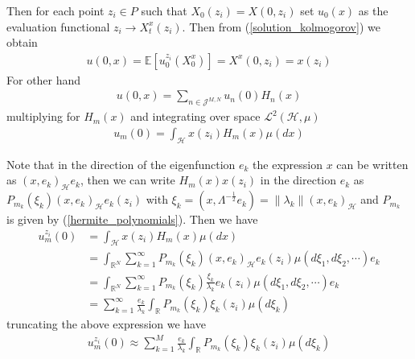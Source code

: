     \noindent Then for each point $z_i \in P$ such that $X_0 (z_i) = X(0, z_i)$ set $u_0 (x)$ as the evaluation functional $z_i \longrightarrow X^x_t (z_i)$. Then from (\ref{solution_kolmogorov}) we obtain
    \begin{align}
   		u(0, x) = \mathbb{E}[u^{z_i}_0 (X^x_0)] = X^x (0, z_i) = x(z_i)
    \end{align}
    For other hand
    \begin{align*}
    	u (0, x) = \displaystyle \sum _{n \in \mathcal{J}^{M, N}} u_{n}(0) H_n (x)
    \end{align*}
    multiplying for $H_m (x)$ and integrating over space $\mathcal{L}^2 (\mathcal{H}, \mu)$ 
    \begin{align*}
    	u_m (0) = \displaystyle \int_{\mathcal{H}} x(z_i) H_m (x) \mu (dx)
    \end{align*}
    
    \noindent Note that in the direction of the eigenfunction $e_k$ the expression $x$ can be written as $(x, e_k )_{\mathcal{H}} e_k$, then we can write $H_m (x) x (z_i)$ in the direction $e_k$ as $P_{m_k} (\xi_k) (x, e_k )_{\mathcal{H}} e_k (z_i)$ with $\xi_k = (x, \Lambda^{-\frac{1}{2}} e_k) = \| \lambda_k \| (x, e_k )_{\mathcal{H}}$ and $P_{m_k}$ is given by (\ref{hermite_polynomials}). Then we have
    \begin{align*}
    	u^{z_i}_m (0) &= \displaystyle \int_{\mathcal{H}} x(z_i) H_m (x) \mu (dx) \\
    	&= \int_{\mathbb{R}^N} \sum_{k=1}^{\infty} P_{m_k} (\xi_k) (x, e_k )_{\mathcal{H}} e_k (z_i) \mu (d\xi_1, d\xi_2, \cdots) e_k \\
    	&= \int_{\mathbb{R}^N} \sum_{k=1}^{\infty} P_{m_k} (\xi_k) \frac{\xi_k}{\lambda_k} e_k (z_i) \mu (d\xi_1, d\xi_2, \cdots) e_k \\
    	&= \sum_{k=1}^{\infty} \frac{e_k}{\lambda_k} \int_{\mathbb{R}}  P_{m_k} (\xi_k) \xi_k (z_i) \mu (d\xi_k)
    \end{align*}
    truncating the above expression we have
    \begin{align}
    \label{IC_approx}
    	u^{z_i}_m (0) \approx \displaystyle \sum_{k=1}^{M} \frac{e_k}{\lambda_k} \int_{\mathbb{R}}  P_{m_k} (\xi_k) \xi_k (z_i) \mu (d\xi_k)
    \end{align} 
    
